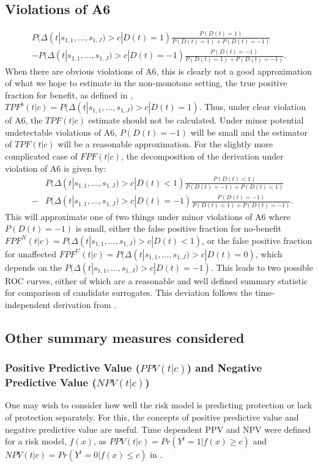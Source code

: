 \documentclass[times, 11pt]{article}
\begin{document}
\subsection{Violations of A6}
\begin{eqnarray*}
P(\Delta(t|s_{1,1}, \dots, s_{1,J})>c|D(t)=1)\frac{P(D(t)=1)}{P(D(t)=1)+P(D(t)=-1)}\\
-P(\Delta(t|s_{1,1}, \dots, s_{1,J})>c|D(t)=-1)\frac{P(D(t)=-1)}{P(D(t)=1)+P(D(t)=-1)}.
\end{eqnarray*}
When there are obvious violations of A6, this is clearly not a good approximation of what we hope to estimate in the non-monotone setting, the true positive fraction for benefit, as defined in \citet{Huang12b}, $TPF^{b}(t|c)=P(\Delta(t|s_{1,1}, \dots, s_{1,J})>c|D(t)=1)$. Thus, under clear violation of A6, the $TPF(t|c)$ estimate should not be calculated. Under minor potential undetectable violations of A6, $P(D(t)=-1)$ will be small and the estimator of $TPF(t|c)$ will be a reasonable approximation. For the slightly more complicated case of $FPF(t|c)$, the decomposition of the derivation under violation of A6 is given by:
\begin{eqnarray*}
&&P(\Delta(t|s_{1,1}, \dots, s_{1,J})>c|D(t)<1)\frac{P(D(t)<1)}{P(D(t)=-1)+P(D(t)<1)}\\
&-&P(\Delta(t|s_{1,1}, \dots, s_{1,J})>c|D(t)=-1)\frac{P(D(t)=-1)}{P(D(t)<1)+P(D(t)=-1)} .
\end{eqnarray*}
This will approximate one of two things under minor violations of A6 where $P(D(t)=-1)$ is small, either the false positive fraction for no-benefit $FPF^{N}(t|c)=P(\Delta(t|s_{1,1}, \dots, s_{1,J})>c|D(t)<1)$, or the false positive fraction for unaffected $FPF^{U}(t|c)=P(\Delta(t|s_{1,1}, \dots, s_{1,J})>c|D(t)=0)$, which depends on the $P(\Delta(t|s_{1,1}, \dots, s_{1,J})>c|D(t)=-1)$. This leads to two possible ROC curves, either of which are a reasonable and well defined summary statistic for comparison of candidate surrogates. This deviation follows the time-independent derivation from \citet{Huang12b}.

\subsection{Other summary measures considered}
\subsubsection{Positive Predictive Value ($PPV(t|c)$) and Negative Predictive Value ($NPV(t|c)$)}
One may wish to consider how well the risk model is predicting protection or lack of protection separately. For this, the concepts of positive predictive value and negative predictive value are useful. Time dependent PPV and NPV were defined for a risk model, $f(x)$, as $PPV(t|c)=Pr(Y^t=1|f(x) \geq c)$ and $NPV(t|c)=Pr(Y^t=0|f(x) \leq c)$ in \citep{Heagerty00}.
\end{document}
